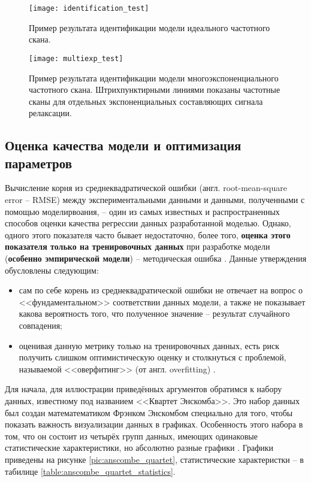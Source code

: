     \begin{figure}[!htp]
        \centering
        \texttt{[image: identification\_test]}
        \caption{Пример результата идентификации модели идеального частотного 
        скана.}
        \label{pic:identification_test}
    \end{figure}


    \begin{figure}[!htp]
        \centering
        \texttt{[image: multiexp\_test]}
        \caption{Пример результата идентификации модели многоэкспоненциального
        частотного скана. Штрихпунктирными линиями показаны частотные сканы для
        отдельных экспоненциальных составляющих сигнала релаксации.}
        \label{pic:multiexp_test}
    \end{figure}


    \subsection{Оценка качества модели и оптимизация параметров} 
    \label{section:quality_and_optimization}
    Вычисление корня из среднеквадратической ошибки (англ. root-mean-square 
    error -- RMSE) между экспериментальными данными и данными, полученными с 
    помощью моделирвоания, -- один из самых известных и распространенных 
    способов оценки качества регрессии данных разработанной моделью. Однако, 
    одного этого показателя часто бывает недостаточно, более того, 
    \textbf{оценка этого показателя только на тренировочных данных} при 
    разработке модели (\textbf{особенно эмпирической модели}) -- методическая 
    ошибка \cite{hands_on_ml, sklearn_cross_validation}. Данные 
    утверждения обусловлены следующим:
    \begin{itemize}
    	\item сам по себе корень из среднеквадратической ошибки не отвечает на 
    	вопрос о <<фундаментальном>> соответствии данных модели, а также не 
    	показывает какова вероятность того, что полученное значение -- результат 
    	случайного совпадения;
    	\item оценивая данную метрику только на тренировочных данных, есть риск
    	получить слишком оптимистическую оценку и столкнуться с проблемой, 
    	называемой <<оверфитинг>> (от англ. overfitting) 
    	\cite{hands_on_ml, sklearn_cross_validation, nikolenko_deep_learning}.
    \end{itemize}

    Для начала, для иллюстрации приведённых аргументов обратимся к набору 
    данных, известному под названием <<Квартет Энскомба>>. Это набор данных был 
    создан математематиком Фрэнком Энскомбом специально для того, чтобы показать
    важность визуализации данных в графиках. Особенность этого набора в том, что
    он состоит из четырёх групп данных, имеющих одинаковые статистические 
    характеристики, но абсолютно разные графики 
    \cite{anscombe_quartet_wikipedia, anscombe_quartet_article}. 
    Графики приведены на рисунке \ref{pic:anscombe_quartet}, статистические 
    характеристки -- в табилице \ref{table:anscombe_quartet_statistics}.

